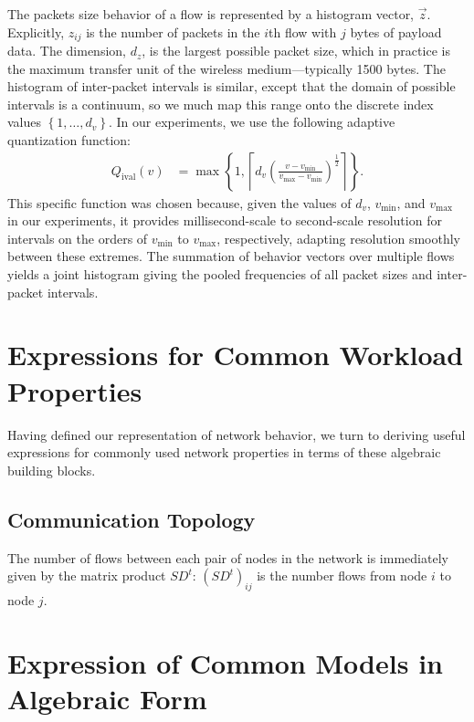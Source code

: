 \documentclass[conference]{IEEEtran}
\newcommand{\Qi}{Q_{\text{ival}}}
\newcommand{\set}[1]{\left\{#1\right\}}
\newcommand{\ceil}[1]{\left\lceil#1\right\rceil}
\newcommand{\fracp}[2]{\left(\frac{#1}{#2}\right)}
\begin{document}
The packets size behavior of a flow is represented by a histogram vector, $\vec{z}$. Explicitly,  $z_{ij}$ is the number of packets in the $i$th flow with $j$ bytes of payload data. The dimension, $d_z$, is the largest possible packet size, which in practice is the maximum transfer unit of the wireless medium---typically 1500 bytes. The histogram of inter-packet intervals is similar, except that the domain of possible intervals is a continuum, so we much map this range onto the discrete index values $\left\{1,\dots,d_v\right\}$. In our experiments, we use the following adaptive quantization function:
\begin{align}
\Qi(v) &= \max\set{1,\ceil{d_v\fracp{v-v_{\min}}{v_{\max}-v_{\min}}^{\frac{1}{2}}}}.
\end{align}
This specific function was chosen because, given the values of $d_v$, $v_{\min}$, and $v_{\max}$ in our experiments, it provides millisecond-scale to second-scale resolution for intervals on the orders of $v_{\min}$ to $v_{\max}$, respectively, adapting resolution smoothly between these extremes.
The summation of behavior vectors over multiple flows yields a joint histogram giving the pooled frequencies of all packet sizes and inter-packet intervals.

\section{Expressions for Common Workload Properties}

Having defined our representation of network behavior, we turn to deriving useful expressions for commonly used network properties in terms of these algebraic building blocks.

\subsection{Communication Topology}

The number of flows between each pair of nodes in the network is immediately given by the matrix product $SD^t$: $(SD^t)_{ij}$ is the number flows from node $i$ to node $j$.

\section{Expression of Common Models in Algebraic Form}
\end{document}
